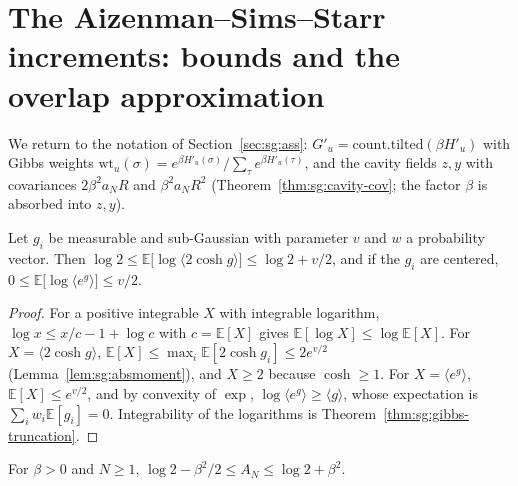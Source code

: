 \section{The Aizenman--Sims--Starr increments: bounds and the overlap approximation}\label{sec:sg:ass-approx}

We return to the notation of Section~\ref{sec:sg:ass}: $G'_u=\mathrm{count.tilted}(\beta H'_u)$ with Gibbs weights $\mathrm{wt}_u(\sigma)=e^{\beta H'_u(\sigma)}/\sum_\tau e^{\beta H'_u(\tau)}$,
and the cavity fields $z,y$ with covariances $2\beta^2a_NR$ and $\beta^2a_NR^2$ (Theorem~\ref{thm:sg:cavity-cov}; the factor $\beta$ is absorbed into $z,y$).

\begin{lemma}\label{lem:sg:jensen}
  \leanok
Let $g_i$ be measurable and sub-Gaussian with parameter $v$ and $w$ a probability vector. Then
$\log2\le\mathbb E\big[\log\langle2\cosh g\rangle\big]\le\log2+v/2$, and if the $g_i$ are centered, $0\le\mathbb E\big[\log\langle e^{g}\rangle\big]\le v/2$.
\end{lemma}

\begin{proof}
  \leanok
For a positive integrable $X$ with integrable logarithm, $\log x\le x/c-1+\log c$ with $c=\mathbb E[X]$ gives $\mathbb E[\log X]\le\log\mathbb E[X]$. For $X=\langle2\cosh g\rangle$,
$\mathbb E[X]\le\max_i\mathbb E[2\cosh g_i]\le2e^{v/2}$ (Lemma~\ref{lem:sg:absmoment}), and $X\ge2$ because $\cosh\ge1$. For $X=\langle e^g\rangle$, $\mathbb E[X]\le e^{v/2}$, and by convexity
of $\exp$, $\log\langle e^g\rangle\ge\langle g\rangle$, whose expectation is $\sum_iw_i\mathbb E[g_i]=0$. Integrability of the logarithms is Theorem~\ref{thm:sg:gibbs-truncation}.
\end{proof}

\begin{theorem}\label{thm:sg:increment-bounds}
  \leanok
For $\beta>0$ and $N\ge1$, $\log2-\beta^2/2\le A_N\le\log2+\beta^2$.
\end{theorem}

